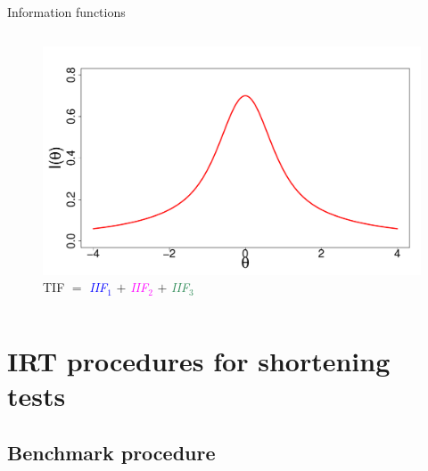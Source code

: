 \documentclass{beamer} %
\begin{document}
\begin{frame}{Information functions}
\begin{columns}[T]
\begin{column}{.50\linewidth}
\begin{figure}
	\centering\includegraphics[width=\linewidth]{img/tif.pdf}
	\caption{TIF $=$ \textcolor{blue}{\emph{IIF}$_1$} $+$ \textcolor{magenta}{\emph{IIF}$_2$} $+$ \textcolor{seagreen}{\emph{IIF}$_3$}}
	\label{sub:tif}
\end{figure}

\end{column}
	
\end{columns}
\end{frame}

\section[Short form procedures]{IRT procedures for shortening tests}

\subsection{Benchmark procedure}
\end{document}

